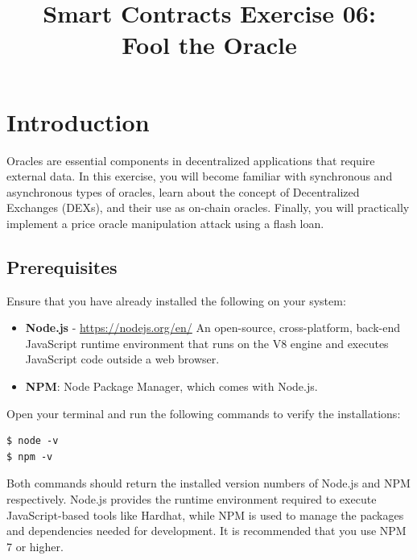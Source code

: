 \documentclass[12pt]{article}
\title{Smart Contracts Exercise 06: \\ Fool the Oracle}
\author{}
\date{}
\begin{document}
\maketitle
\section{Introduction}

Oracles are essential components in decentralized applications that require external data. In this exercise, you will become familiar with synchronous and asynchronous types of oracles, learn about the concept of Decentralized Exchanges (DEXs), and their use as on-chain oracles. Finally, you will practically implement a price oracle manipulation attack using a flash loan.

\subsection*{Prerequisites}

Ensure that you have already installed the following on your system:

\begin{itemize}
    \item \textbf{Node.js} - \url{https://nodejs.org/en/}
    An open-source, cross-platform, back-end JavaScript runtime environment that runs on the V8 engine and executes JavaScript code outside a web browser. 
    \item \textbf{NPM}: Node Package Manager, which comes with Node.js.
\end{itemize}

Open your terminal and run the following commands to verify the installations:

\begin{verbatim}
$ node -v
$ npm -v
\end{verbatim}

Both commands should return the installed version numbers of Node.js and NPM respectively. Node.js provides the runtime environment required to execute JavaScript-based tools like Hardhat, while NPM is used to manage the packages and dependencies needed for development. It is recommended that you use NPM 7 or higher.

\end{document}

